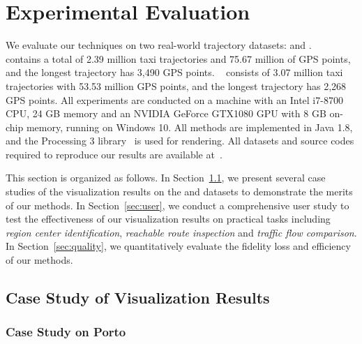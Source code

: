 \section{Experimental Evaluation}\label{sec:exp}
We evaluate our techniques on two real-world trajectory datasets: \pt{} and \sz{}.
\pt{}~\cite{pt} contains a total of 2.39 million taxi trajectories and 75.67 million of GPS points, and the longest trajectory has 3,490 GPS points.
\sz{}~\cite{sz} consists of 3.07 million taxi trajectories with 53.53 million GPS points, and the longest trajectory has 2,268 GPS points. All experiments are conducted on a machine with an Intel i7-8700 CPU, 24 GB memory and an NVIDIA GeForce GTX1080 GPU with 8 GB on-chip memory, running on Windows 10. All methods are implemented in Java 1.8, and the Processing 3 library~\cite{p3} is used for rendering. All datasets and source codes required to reproduce our results are available at~\cite{code}.

This section is organized as follows.
In Section~\ref{sec:case}, we present several case studies of the visualization results on the \pt{} and \sz{} datasets to demonstrate the merits of our methods.
In Section~\ref{sec:user}, we conduct a comprehensive user study to test the effectiveness of our visualization results on practical  tasks including \textit{region center identification}, \textit{reachable route inspection} and \textit{traffic flow comparison}. In Section~\ref{sec:quality}, we quantitatively evaluate the fidelity loss and efficiency of our methods.

\trim \trim

\subsection{Case Study of Visualization Results}\label{sec:case}
\subsubsection{Case Study on Porto}\label{sec:pt}


